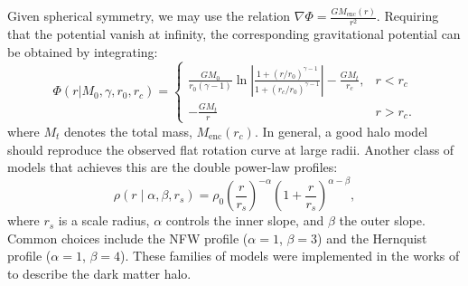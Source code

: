         Given spherical symmetry, we may use the relation $\nabla \Phi = \frac{G M_{\mathrm{enc}}(r)}{r^2}$. Requiring that the potential vanish at infinity, the corresponding gravitational potential can be obtained by integrating:
        \begin{equation}
            \Phi(r|M_0,\gamma,r_0,r_c) = 
            \begin{cases}
                \frac{GM_0}{r_0\left(\gamma-1\right)}\ln\left|\frac{1+(r/r_0)^{\gamma-1}}{1+(r_c/r_0)^{\gamma-1}}\right| -\frac{GM_t}{r_c}, & r<r_c\\
                -\frac{GM_t}{r} & r>r_c.
            \end{cases}
        \end{equation}
        where $M_t$ denotes the total mass, $M_{\mathrm{enc}}(r_c)$. In general, a good halo model should reproduce the observed flat rotation curve at large radii. Another class of models that achieves this are the double power-law profiles:
        \begin{equation}
            \rho(r \mid \alpha, \beta, r_s) = \rho_0 \left( \frac{r}{r_s} \right)^{-\alpha} \left(1 + \frac{r}{r_s} \right)^{\alpha - \beta},
        \end{equation}
        where $r_s$ is a scale radius, $\alpha$ controls the inner slope, and $\beta$ the outer slope. Common choices include the NFW profile ($\alpha = 1$, $\beta = 3$) and the Hernquist profile ($\alpha = 1$, $\beta = 4$). These families of models were implemented in the works of \citet{2015ApJS..216...29B, 2017MNRAS.465...76M} to describe the dark matter halo.


